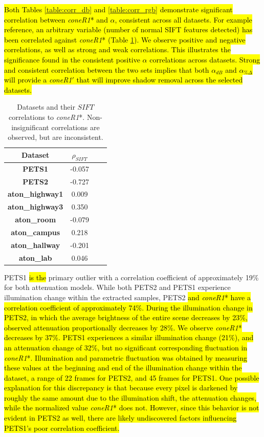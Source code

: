 \documentclass[12pt]{report}
\begin{document}
\hl{Both Tables \ref{table:corr_db} and \ref{table:corr_rgb} demonstrate significant correlation between \textit{coneR1}* and $\alpha$, consistent across all datasets. For example reference, an arbitrary variable (number of normal SIFT features detected) has been correlated against \textit{coneR1}* (Table \ref{table:bad_corr}). We observe positive and negative correlations, as well as strong and weak correlations. This illustrates the significance found in the consistent positive $\alpha$ correlations across datasets. Strong and consistent correlation between the two sets implies that both $\alpha_{dB}$ and $\alpha_{\%\Delta}$ will provide a \textit{coneR1}$'$ that will improve shadow removal across the selected datasets.}

\begin{table}
\centering
\begin{tabular}{ |c|c|c|c| }
	\hline
	\textbf{Dataset} & \textbf{$\rho_{SIFT}$} \\
	\hline
	\hline
	\textbf{PETS1} & -0.057 \\
	\hline
	\textbf{PETS2} & -0.727 \\
	\hline
	\textbf{aton\_highway1} & 0.009 \\
	\hline
	\textbf{aton\_highway3} & 0.350 \\
	\hline
	\textbf{aton\_room} & -0.079 \\
	\hline
	\textbf{aton\_campus} & 0.218 \\
	\hline
	\textbf{aton\_hallway} & -0.201 \\
	\hline
	\textbf{aton\_lab} & 0.046 \\
	\hline
\end{tabular}
\caption{Datasets and their $SIFT$ correlations to \textit{coneR1}*. Non-insignificant correlations are observed, but are inconsistent.}
\label{table:bad_corr}
\end{table}

PETS1 \hl{is the} primary outlier with a correlation coefficient of approximately 19\% for both attenuation models. While both PETS2 and PETS1 experience illumination change within the extracted samples, PETS2 \hl{and \textit{coneR1}* have a correlation coefficient of approximately 74\%. During the illumination change in PETS2, in which the average brightness of the entire scene decreases by 23\%, observed attenuation proportionally decreases by 28\%. We observe \textit{coneR1}* decreases by 37\%. PETS1 experiences a similar illumination change (21\%), and an attenuation change of 32\%, but no significant corresponding fluctuation in \textit{coneR1}*. Illumination and parametric fluctuation was obtained by measuring these values at the beginning and end of the illumination change within the dataset, a range of 22 frames for PETS2, and 45 frames for PETS1. One possible explanation for this discrepancy is that because every pixel is darkened by roughly the same amount due to the illumination shift, the attenuation changes, while the normalized value \textit{coneR1}* does not. However, since this behavior is not evident in PETS2 as well, there are likely undiscovered factors influencing PETS1's poor correlation coefficient.}
\end{document}
